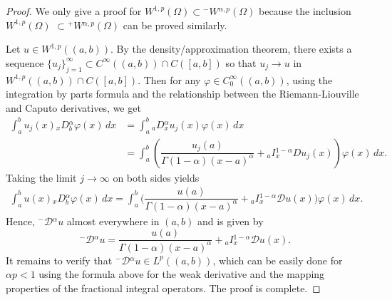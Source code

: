 \documentclass[leqno,final]{siamltex}
\numberwithin{equation}{section}
\renewcommand{\(}{\bigl(}
\renewcommand{\)}{\bigr)}
\begin{document}
        \begin{proof}
            We only give a proof for $W^{1,p}(\Omega) \subset {^{-}}{W}{^{\alpha,p}}(\Omega)$ because 
             the inclusion $W^{1,p}(\Omega)$ $\subset {^{+}}{W}{^{\alpha,p}}(\Omega)$ can be proved similarly.
            
            Let $u \in W^{1,p}((a,b))$. By the density/approximation theorem, there exists a sequence $\{u_j\}_{j=1}^{\infty} \subset C^{\infty}((a,b))\cap C([a,b])$ so that 
            $u_j \rightarrow u$ in $W^{1,p}((a,b))\cap C([a,b])$. 
            Then for any $\varphi \in C^{\infty}_{0}((a,b))$, using the integration by parts formula and the 
            relationship between the Riemann-Liouville and Caputo derivatives, we get 
            \begin{align*}
              \int_{a}^{b} u_j(x) {_{x}}{D}{^{\alpha}_{b}} \varphi(x)\,dx 
                &=\int_{a}^{b} {_{a}}{D}{^{\alpha}_{x}}u_j(x) \varphi (x)\,dx \\
                &= \int_{a}^{b} \left(\dfrac{u_{j}(a)  }{\Gamma(1- \alpha) (x-a)^{\alpha}} + {_{a}}{I}{^{1-\alpha}_{x}} Du_j(x)\right) \varphi(x)\,dx.
            \end{align*}
            Taking the limit $j\to \infty$ on both sides yields 
            \begin{align*}
                \int_{a}^{b} u(x) {_{x}}{D}{^{\alpha}_{b}} \varphi(x)\, dx 
                = \int_{a}^{b} \biggl( \dfrac{u(a) }{\Gamma(1-\alpha) (x-a)^{\alpha}} + {_{a}}{I}{^{1-\alpha}_{x}} \mathcal{D}u(x)\biggr) \varphi(x)\,dx.
            \end{align*}
            Hence, ${^{-}}{\mathcal{D}}{^{\alpha}} u$ almost everywhere in $(a,b)$ and is given by
            \begin{equation}\label{weak_Caputo}
            {^{-}}{\mathcal{D}}{^{\alpha}} u = \dfrac{u(a) }{\Gamma(1-\alpha) (x-a)^{\alpha}} 
            + {_{a}}{I}{^{1-\alpha}_{x}} \mathcal{D}u(x).
            \end{equation}
            It remains to verify that ${^{-}}{\mathcal{D}}{^{\alpha}} u \in L^{p}((a,b))$, which 
            can be easily done for $\alpha p<1$ using the formula above for the weak derivative and 
            the mapping properties of the fractional integral operators. The proof is complete.
        \end{proof}
    
\end{document}
